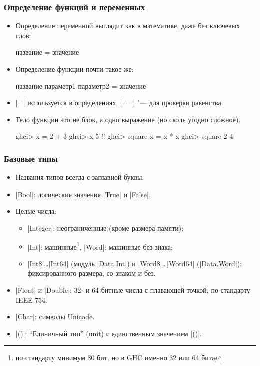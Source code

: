 \documentclass[10pt]{beamer}
\begin{document}
\begin{frame}[fragile]
  \frametitle{Определение функций и переменных}
  \begin{itemize}
    \item Определение переменной выглядит как в математике, даже без ключевых слов:
          \begin{haskell}
            название = значение
          \end{haskell}
    \item Определение функции почти такое же:
          \begin{haskell}
            название параметр1 параметр2 = значение
          \end{haskell}
    \item \haskinline|=| используется в определениях, \haskinline|==| "--- для проверки равенства.
    \item Тело функции это не блок, а одно выражение (но сколь угодно сложное).
          \begin{haskell}
            ghci> x = 2 + 3
            ghci> x
            5
            !\pause!
            ghci> square x = x * x
            ghci> square 2
            4
          \end{haskell}
  \end{itemize}
\end{frame}

\begin{frame}[fragile]
  \frametitle{Базовые типы}
  \begin{itemize}
    \item Названия типов всегда с заглавной буквы.
    \item \haskinline|Bool|: логические значения \haskinline|True| и \haskinline|False|.
    \item Целые числа:
          \begin{itemize}
            \item \haskinline|Integer|: неограниченные (кроме размера памяти);
            \item \haskinline|Int|: машинные\footnote{по стандарту минимум 30 бит, но в GHC именно 32 или 64 бита}, \haskinline|Word|: машинные без знака;
            \item \haskinline|Int8|\ldots\haskinline|Int64| (модуль \haskinline|Data.Int|) и \haskinline|Word8|\ldots\haskinline|Word64| (\haskinline|Data.Word|): фиксированного размера, со знаком и без.
          \end{itemize}
    \item \haskinline|Float| и \haskinline|Double|: 32- и 64-битные числа с плавающей точкой, по стандарту IEEE-754.
    \item \haskinline|Char|: символы Unicode.
    \item \haskinline|()|: \enquote{Единичный тип} (unit) с единственным значением \haskinline|()|.
  \end{itemize}
\end{frame}
\end{document}
